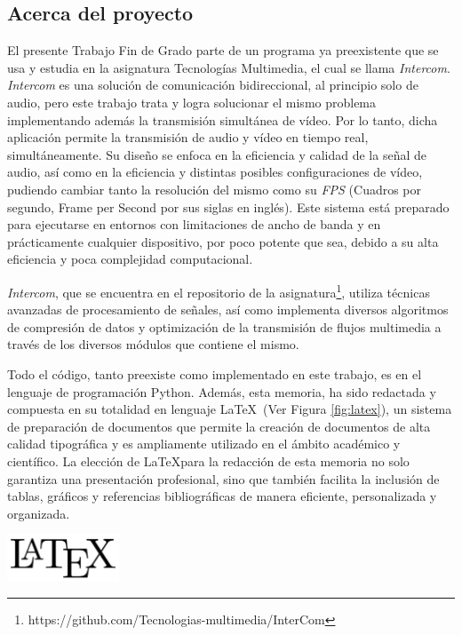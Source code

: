\label{sec:justificacion_y_objetivos}

\subsection{Acerca del proyecto}

El presente Trabajo Fin de Grado parte de un programa ya preexistente que se usa y estudia en la asignatura Tecnologías Multimedia, el cual se llama \textit{Intercom}. \textit{Intercom} es una solución de comunicación bidireccional, al principio solo de audio, pero este trabajo trata y logra solucionar el mismo problema implementando además la transmisión simultánea de vídeo. Por lo tanto, dicha aplicación permite la transmisión de audio y vídeo en tiempo real, simultáneamente. Su diseño se enfoca en la eficiencia y calidad de la señal de audio, así como en la eficiencia y distintas posibles configuraciones de vídeo, pudiendo cambiar tanto la resolución del mismo como su \textit{FPS} (Cuadros por segundo, Frame per Second por sus siglas en inglés). Este sistema está preparado para ejecutarse en entornos con limitaciones de ancho de banda y en prácticamente cualquier dispositivo, por poco potente que sea, debido a su alta eficiencia y poca complejidad computacional.
\vspace{\baselineskip}

\textit{Intercom}, que se encuentra en el repositorio de la asignatura\footnote{https://github.com/Tecnologias-multimedia/InterCom}, utiliza técnicas avanzadas de procesamiento de señales, así como implementa diversos algoritmos de compresión de datos y optimización de la transmisión de flujos multimedia a través de los diversos módulos que contiene el mismo. 

\vspace{\baselineskip}
Todo el código, tanto preexiste como implementado en este trabajo, es en el lenguaje de programación Python. Además, esta memoria, ha sido redactada y compuesta en su totalidad en lenguaje \LaTeX~(Ver Figura \ref{fig:latex}), un sistema de preparación de documentos que permite la creación de documentos de alta calidad tipográfica y es ampliamente utilizado en el ámbito académico y científico. La elección de \LaTeX para la redacción de esta memoria no solo garantiza una presentación profesional, sino que también facilita la inclusión de tablas, gráficos y referencias bibliográficas de manera eficiente, personalizada y organizada.

\vspace{\baselineskip}
\begin{center}
	\includegraphics[width = 0.25\textwidth]{images/LaTeX_logo.png}
	\label{fig:latex}
\end{center}
\vspace{\baselineskip}

